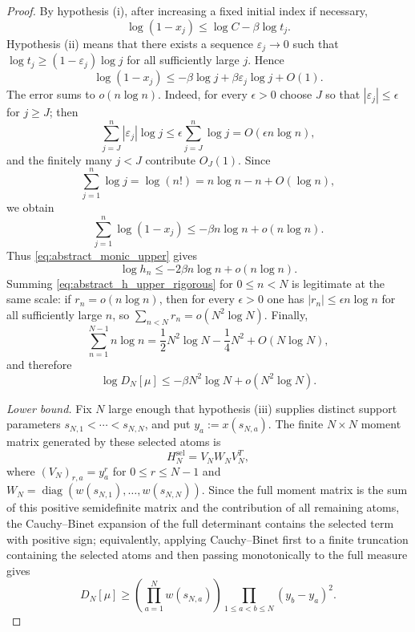 \documentclass[11pt]{amsart}
\numberwithin{equation}{section}
\theoremstyle{plain}
\theoremstyle{definition}
\theoremstyle{remark}
\begin{document}
\begin{proof}
By hypothesis (i), after increasing a fixed initial index if necessary,
\begin{equation}
\log(1-x_j)\le \log C-\beta\log t_j.
\end{equation}
Hypothesis (ii) means that there exists a sequence $\varepsilon_j\to0$ such that
$\log t_j\ge(1-\varepsilon_j)\log j$ for all sufficiently large $j$.  Hence
\begin{equation}
\log(1-x_j)
\le-\beta\log j+\beta\varepsilon_j\log j+O(1).
\label{eq:abstract_point_upper_explicit}
\end{equation}
The error sums to $o(n\log n)$.  Indeed, for every $\epsilon>0$ choose $J$ so that $|\varepsilon_j|\le\epsilon$ for $j\ge J$; then
\begin{equation}
\sum_{j=J}^{n}|\varepsilon_j|\log j
\le\epsilon\sum_{j=J}^{n}\log j
=O(\epsilon n\log n),
\end{equation}
and the finitely many $j<J$ contribute $O_J(1)$.  Since
\begin{equation}
\sum_{j=1}^{n}\log j=\log(n!)=n\log n-n+O(\log n),
\end{equation}
we obtain
\begin{equation}
\sum_{j=1}^{n}\log(1-x_j)
\le-\beta n\log n+o(n\log n).
\end{equation}
Thus \eqref{eq:abstract_monic_upper} gives
\begin{equation}
\log h_n\le-2\beta n\log n+o(n\log n).
\label{eq:abstract_h_upper_rigorous}
\end{equation}
Summing \eqref{eq:abstract_h_upper_rigorous} for $0\le n<N$ is legitimate at the same scale: if $r_n=o(n\log n)$, then for every $\epsilon>0$ one has $|r_n|\le\epsilon n\log n$ for all sufficiently large $n$, so
$\sum_{n<N}r_n=o(N^2\log N)$.  Finally,
\begin{equation}
\sum_{n=1}^{N-1}n\log n
=\frac12N^2\log N-\frac14N^2+O(N\log N),
\end{equation}
and therefore
\begin{equation}
\log D_N[\mu]
\le-\beta N^2\log N+o(N^2\log N).
\label{eq:abstract_det_upper}
\end{equation}

\emph{Lower bound.}
Fix $N$ large enough that hypothesis (iii) supplies distinct support parameters
$s_{N,1}<\cdots<s_{N,N}$, and put $y_a:=x(s_{N,a})$.  The finite $N\times N$ moment matrix generated by these selected atoms is
\begin{equation}
H_N^{\mathrm{sel}}=V_NW_NV_N^T,
\end{equation}
where $(V_N)_{r,a}=y_a^{r}$ for $0\le r\le N-1$ and
$W_N=\operatorname{diag}(w(s_{N,1}),\ldots,w(s_{N,N}))$.  Since the full moment matrix is the sum of this positive semidefinite matrix and the contribution of all remaining atoms, the Cauchy--Binet expansion of the full determinant contains the selected term with positive sign; equivalently, applying Cauchy--Binet first to a finite truncation containing the selected atoms and then passing monotonically to the full measure gives
\begin{equation}
D_N[\mu]\ge
\left(\prod_{a=1}^{N}w(s_{N,a})\right)
\prod_{1\le a<b\le N}(y_b-y_a)^2.
\label{eq:abstract_one_term_lower}
\end{equation}


\end{proof}
\end{document}
